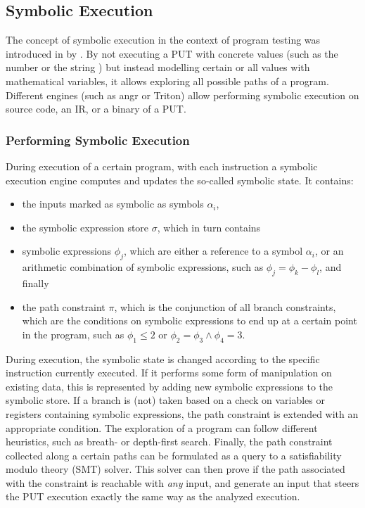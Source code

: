 \documentclass{article}
\begin{document}
\begin{multicols}{2}
    \subsection{Symbolic Execution}
    \label{SymbolicExecution}
    The concept of symbolic execution in the context of program testing was introduced in \citeyear{Symbex} by \citeauthor{Symbex}.\cite{Symbex} By not executing a PUT with concrete values (such as the number  or the string ) but instead modelling certain or all values with mathematical variables, it allows exploring all possible paths of a program. Different engines (such as angr\cite{angr} or Triton\cite{Triton}) allow performing symbolic execution on source code, an IR, or a binary of a PUT.

    \subsubsection{Performing Symbolic Execution}
    During execution of a certain program, with each instruction a symbolic execution engine computes and updates the so-called symbolic state. It contains:
    \begin{itemize}
        \item the inputs marked as symbolic as symbols $\alpha_i$,
        \item the symbolic expression store $\sigma$, which in turn contains
        \item symbolic expressions $\phi_j$, which are either a reference to a symbol $\alpha_i$, or an arithmetic combination of symbolic expressions, such as $\phi_j=\phi_k-\phi_l$, and finally
        \item the path constraint $\pi$, which is the conjunction of all branch constraints, which are the conditions on symbolic expressions to end up at a certain point in the program, such as $\phi_1\leq2$ or $\phi_2=\phi_3\land\phi_4=3$.
    \end{itemize}

    During execution, the symbolic state is changed according to the specific instruction currently executed. If it performs some form of manipulation on existing data, this is represented by adding new symbolic expressions to the symbolic store. If a branch is (not) taken based on a check on variables or registers containing symbolic expressions, the path constraint is extended with an appropriate condition. The exploration of a program can follow different heuristics, such as breath- or depth-first search. Finally, the path constraint collected along a certain paths can be formulated as a query to a satisfiability modulo theory (SMT) solver. This solver can then prove if the path associated with the constraint is reachable with \textit{any} input, and generate an input that steers the PUT execution exactly the same way as the analyzed execution.


\end{multicols}
\end{document}

